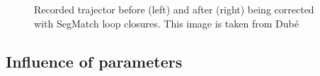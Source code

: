 \begin{figure}[!tbp]
\begin{minipage}[b]{0.4\textwidth}
  \end{minipage}
  \caption{Recorded trajector before (left) and after (right) being corrected with SegMatch loop closures. This image is taken from Dubé \cite{segmatch}}
\end{figure}

\subsection{Influence of parameters}
